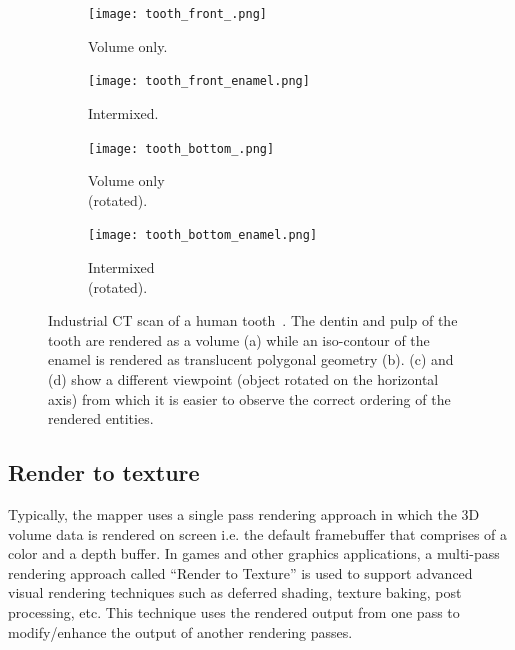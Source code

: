 \begin{figure}[htb]
\centering
  \begin{subfigure}[b]{.35\columnwidth}
    \centering
    \texttt{[image: tooth\_front\_.png]}
    \caption{Volume only.}
    \label{fig:tooth_front}
  \end{subfigure}
  \begin{subfigure}[b]{.35\columnwidth}
    \centering
    \texttt{[image: tooth\_front\_enamel.png]}
    \caption{Intermixed.}
    \label{fig:tooth_front_enamel}
  \end{subfigure}
  \begin{subfigure}[b]{.35\columnwidth}
    \centering
    \texttt{[image: tooth\_bottom\_.png]}
    \caption{Volume only \\(rotated).}
    \label{fig:tooth_bottom}
  \end{subfigure}
  \begin{subfigure}[b]{.35\columnwidth}
    \centering
    \texttt{[image: tooth\_bottom\_enamel.png]}
    \caption{Intermixed \\(rotated).}
    \label{fig:tooth_bottom_enamel}
  \end{subfigure}
  \caption{Industrial CT scan of a human tooth~\citep{pfister_tf_bakeoff_2001}.
    The dentin and pulp of the tooth are rendered as a volume (a) while an
    iso-contour of the enamel is rendered as translucent polygonal geometry (b).
    (c) and (d) show a different viewpoint (object rotated on the horizontal axis)
    from which it is easier to observe the correct ordering of the rendered
    entities.}
  \label{fig:volume_peeling_tooth}
\end{figure}

\subsection{Render to texture}
Typically, the mapper uses a single pass
rendering approach in which the 3D volume data is rendered on screen i.e. the
default framebuffer that comprises of a color and a depth buffer. In games and
other graphics applications, a multi-pass rendering approach called ``Render to
Texture'' is used to support advanced visual rendering techniques such as
deferred shading, texture baking, post processing, etc. This technique uses the
rendered output from one pass to modify/enhance the output of another rendering
passes.

